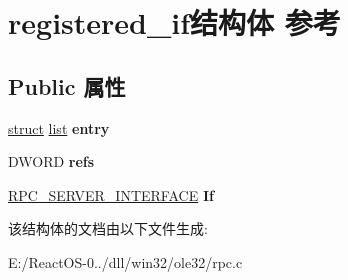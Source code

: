 \hypertarget{structregistered__if}{}\section{registered\+\_\+if结构体 参考}
\label{structregistered__if}
\subsection*{Public 属性}
\begin{DoxyCompactItemize}
\item 
\mbox{\label{structregistered__if_a9ac9aa479d39479bce64a67b8fc6039d}} 
\hyperlink{interfacestruct}{struct} \hyperlink{classlist}{list} {\bfseries entry}
\item 
\mbox{\label{structregistered__if_a9a2085d331b9859242ed8bb5b08d2678}} 
D\+W\+O\+RD {\bfseries refs}
\item 
\mbox{\label{structregistered__if_ae67ca5ecfad63e98ebd5707da5dc7849}} 
\hyperlink{struct___r_p_c___s_e_r_v_e_r___i_n_t_e_r_f_a_c_e}{R\+P\+C\+\_\+\+S\+E\+R\+V\+E\+R\+\_\+\+I\+N\+T\+E\+R\+F\+A\+CE} {\bfseries If}
\end{DoxyCompactItemize}


该结构体的文档由以下文件生成\+:\begin{DoxyCompactItemize}
\item 
E\+:/\+React\+O\+S-\/0../dll/win32/ole32/rpc.\+c\end{DoxyCompactItemize}
